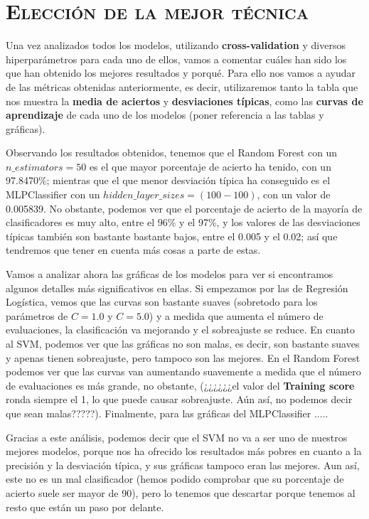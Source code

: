 \documentclass[11pt,a4paper]{article}
\begin{document}
\newpage

\section{\textsc{Elección de la mejor técnica}}

Una vez analizados todos los modelos, utilizando \textbf{cross-validation} y diversos hiperparámetros para cada uno de ellos, vamos a comentar cuáles han sido los que han obtenido los mejores resultados y porqué. Para ello nos vamos a ayudar de las métricas obtenidas anteriormente, es decir, utilizaremos tanto la tabla que nos muestra la \textbf{media de aciertos} y \textbf{desviaciones típicas}, como las \textbf{curvas de aprendizaje} de cada uno de los modelos (poner referencia a las tablas y gráficas).

Observando los resultados obtenidos, tenemos que el Random Forest con un $n\_estimators = 50$ es el que mayor porcentaje de acierto ha tenido, con un 97.8470\%; mientras que el que menor desviación típica ha conseguido es el MLPClassifier con un $hidden\_layer\_sizes = (100-100)$, con un valor de 0.005839. No obstante, podemos ver que el porcentaje de acierto de la mayoría de clasificadores es muy alto, entre el 96\% y el 97\%, y los valores de las desviaciones típicas también son bastante bastante bajos, entre el 0.005 y el 0.02; así que tendremos que tener en cuenta más cosas a parte de estas.

Vamos a analizar ahora las gráficas de los modelos para ver si encontramos algunos detalles más significativos en ellas. Si empezamos por las de Regresión Logística, vemos que las curvas son bastante suaves (sobretodo para los parámetros de $C = 1.0$ y $C = 5.0$) y a medida que aumenta el número de evaluaciones, la clasificación va mejorando y el sobreajuste se reduce. En cuanto al SVM, podemos ver que las gráficas no son malas, es decir, son bastante suaves y apenas tienen sobreajuste, pero tampoco son las mejores. En el Random Forest podemos ver que las curvas van aumentando suavemente a medida que el número de evaluaciones es más grande, no obstante, (¿¿¿¿¿¿el valor del \textbf{Training score} ronda siempre el 1, lo que puede causar sobreajuste. Aún así, no podemos decir que sean malas?????). Finalmente, para las gráficas del MLPClassifier .....

Gracias a este análisis, podemos decir que el SVM no va a ser uno de nuestros mejores modelos, porque nos ha ofrecido los resultados más pobres en cuanto a la precisión y la desviación típica, y sus gráficas tampoco eran las mejores. Aun así, este no es un mal clasificador (hemos podido comprobar que su porcentaje de acierto suele ser mayor de 90), pero lo tenemos que descartar porque tenemos al resto que están un paso por delante.
\end{document}
